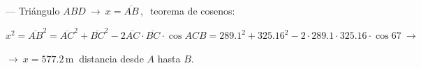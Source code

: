 \begin{miejercicio}
\vspace{6mm} --- Triángulo $ABD \ \to \ x=\overline{AB}\, , \  $ teorema de cosenos:

\vspace{2mm} $x^2=\overline{AB}^2=\overline{AC}^2+\overline{BC}^2-2\overline{AC}\cdot \overline{BC}\cdot \cos \widehat{ACB}=289.1^2+325.16^2-2\cdot 289.1\cdot 325.16\cdot \cos 67 \ \to $

\vspace{2mm} $\to \ x=577.2\, \mathrm{m}\ $ distancia desde $A$ hasta $B$.

\vspace{2mm}

\vspace{2mm}

	
\end{miejercicio}



